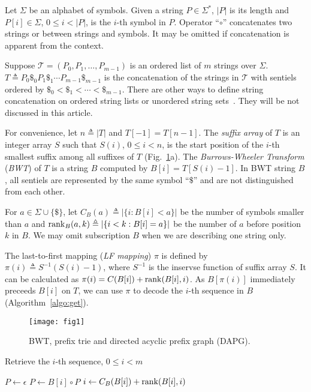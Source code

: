 \documentclass[webpdf,contemporary,large,namedate]{oup-authoring-template}%
\begin{document}
Let $\Sigma$ be an alphabet of symbols.
Given a string $P\in\Sigma^*$, $|P|$ is its length and $P[i]\in\Sigma$, $0\le i<|P|$, is the $i$-th symbol in $P$.
Operator ``$\circ$'' concatenates two strings or between strings and symbols.
It may be omitted if concatenation is apparent from the context.

Suppose $\mathcal{T}=(P_0,P_1,\ldots,P_{m-1})$ is an ordered list of $m$ strings over $\Sigma$.
$T\triangleq P_0\$_0P_1\$_1\cdots P_{m-1}\$_{m-1}$ is the concatenation of the strings in $\mathcal{T}$
with sentiels ordered by $\$_0<\$_1<\cdots<\$_{m-1}$.
There are other ways to define string concatenation on ordered string lists or unordered string sets~\citep{Cenzato:2024ab,Li:2014ab}.
They will be not discussed in this article.

For convenience, let $n\triangleq|T|$ and $T[-1]=T[n-1]$.
The \emph{suffix array} of $T$ is an integer array $S$ such that $S(i)$,
$0\le i<n$, is the start position of the $i$-th smallest suffix among all suffixes of $T$ (Fig.~\ref{fig:1}a).
The \emph{Burrows-Wheeler Transform} (\emph{BWT}) of $T$ is a string $B$ computed by $B[i]=T[S(i)-1]$.
In BWT string $B$, all sentiels are represented by the same symbol ``$\$$'' and are not distinguished from each other.

For $a\in\Sigma\cup\{\$\}$, let $C_B(a)\triangleq|\{i:B[i]<a\}|$ be the number of symbols smaller than $a$
and ${\rm rank}_B(a,k)\triangleq|\{i<k:B[i]=a\}|$ be the number of $a$ before position $k$ in $B$.
We may omit subscription $B$ when we are describing one string only.

The last-to-first mapping (\emph{LF mapping}) $\pi$ is defined by $\pi(i)\triangleq S^{-1}(S(i)-1)$,
where $S^{-1}$ is the inservse function of suffix array $S$.
It can be calculated as $\pi(i)=C(B[i])+{\rm rank}(B[i],i)$.
As $B[\pi(i)]$ immediately preceeds $B[i]$ on $T$, we can use $\pi$ to decode the $i$-th sequence in $B$ (Algorithm~\ref{algo:get}).

\begin{figure}[tb]
\centering
\texttt{[image: fig1]}
\caption{BWT, prefix trie and directed acyclic prefix graph (DAPG).}\label{fig:1}
\end{figure}

\begin{algorithm}[!htb]
	\caption{Retrieve the $i$-th sequence, $0\le i<m$}\label{algo:get}
	\begin{algorithmic}[1]
			\State $P\gets\epsilon$
			\State $P\gets B[i]\circ P$
			\State $i\gets C_B(B[i])+{\rm rank}(B[i],i)$
			\EndWhile
			\State {}
		\EndProcedure
	\end{algorithmic}
\end{algorithm}
\end{document}
